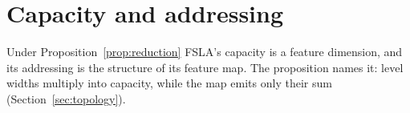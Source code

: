 %
%
%
\section{Capacity and addressing}
\label{sec:capacity}

Under Proposition~\ref{prop:reduction} FSLA's capacity is a feature dimension, and its addressing is the structure of its feature map. The proposition names it: level widths multiply into capacity, while the map emits only their sum (Section~\ref{sec:topology}).

